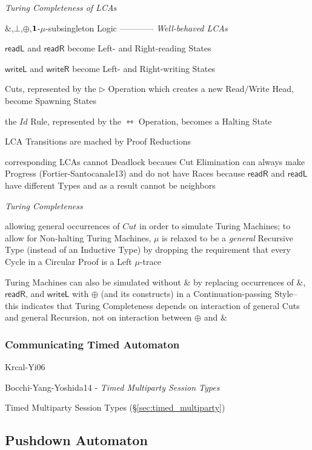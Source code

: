 \emph{Turing Completeness of LCAs}

$\&$,$\bot$,$\oplus$,$\mathbf{1}$-$\mu$-subsingleton Logic ------------
\emph{Well-behaved LCAs}

$\mathsf{readL}$ and $\mathsf{readR}$ become Left- and Right-reading
States

$\mathsf{writeL}$ and $\mathsf{writeR}$ become Left- and Right-writing
States

Cuts, represented by the $\rhd$ Operation which creates a new
Read/Write Head, become Spawning States

the $Id$ Rule, represented by the $\leftrightarrowtriangle$ Operation,
becomes a Halting State

LCA Transitions are mached by Proof Reductions

corresponding LCAs cannot Deadlock becaues Cut Elimination can always
make Progress (Fortier-Santocanale13) and do not have Races because
$\mathsf{readR}$ and $\mathsf{readL}$ have different Types and as a
result cannot be neighbors


\emph{Turing Completeness}

allowing general occurrences of $Cut$ in order to simulate Turing
Machines; to allow for Non-halting Turing Machines, $\mu$ is relaxed
to be a \emph{general} Recursive Type (instead of an Inductive Type)
by dropping the requirement that every Cycle in a Circular Proof is a
Left $\mu$-trace

Turing Machines can also be simulated without $\&$ by replacing
occurrences of $\&$, $\mathsf{readR}$, and $\mathsf{writeL}$ with
$\oplus$ (and its constructs) in a Continuation-passing Style-- this
indicates that Turing Completeness depends on interaction of general
Cuts and general Recursion, not on interaction between $\oplus$ and
$\&$



\subsubsection{Communicating Timed Automaton}\label{sec:communicating_timed_fsm}

Krcal-Yi06

Bocchi-Yang-Yoshida14 - \emph{Timed Multiparty Session Types}

Timed Multiparty Session Types (\S\ref{sec:timed_multiparty})



\subsection{Pushdown Automaton}\label{sec:pushdown_automaton}

